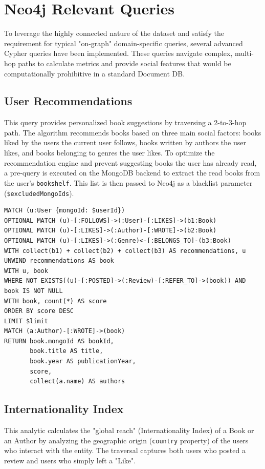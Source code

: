 \section{Neo4j Relevant Queries}
To leverage the highly connected nature of the dataset and satisfy the requirement for typical "on-graph" domain-specific queries, several advanced Cypher queries have been implemented. These queries navigate complex, multi-hop paths to calculate metrics and provide social features that would be computationally prohibitive in a standard Document DB.

\subsection{User Recommendations}
This query provides personalized book suggestions by traversing a 2-to-3-hop path. The algorithm recommends books based on three main social factors: books liked by the users the current user follows, books written by authors the user likes, and books belonging to genres the user likes. 
To optimize the recommendation engine and prevent suggesting books the user has already read, a pre-query is executed on the MongoDB backend to extract the read books from the user's \texttt{bookshelf}. This list is then passed to Neo4j as a blacklist parameter (\texttt{\$excludedMongoIds}).

\begin{lstlisting}[language=Cypher, caption={Cypher Query for User Recommendations}]
MATCH (u:User {mongoId: $userId})
OPTIONAL MATCH (u)-[:FOLLOWS]->(:User)-[:LIKES]->(b1:Book)
OPTIONAL MATCH (u)-[:LIKES]->(:Author)-[:WROTE]->(b2:Book)
OPTIONAL MATCH (u)-[:LIKES]->(:Genre)<-[:BELONGS_TO]-(b3:Book)
WITH collect(b1) + collect(b2) + collect(b3) AS recommendations, u
UNWIND recommendations AS book
WITH u, book
WHERE NOT EXISTS((u)-[:POSTED]->(:Review)-[:REFER_TO]->(book)) AND book IS NOT NULL
WITH book, count(*) AS score
ORDER BY score DESC
LIMIT $limit
MATCH (a:Author)-[:WROTE]->(book)
RETURN book.mongoId AS bookId, 
       book.title AS title, 
       book.year AS publicationYear,
       score,
       collect(a.name) AS authors
\end{lstlisting}

\subsection{Internationality Index}
This analytic calculates the "global reach" (Internationality Index) of a Book or an Author by analyzing the geographic origin (\texttt{country} property) of the users who interact with the entity. The traversal captures both users who posted a review and users who simply left a "Like".

